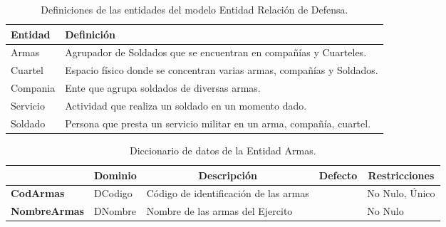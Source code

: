 \begin{table}[H]
\centering
\caption{Definiciones de las entidades del modelo Entidad Relación de Defensa.}
\renewcommand{\arraystretch}{1.5}%
\label{tab-Dicc-00}
\begin{tabular}{@{}ll@{}}
\toprule
\textbf{Entidad}  & \textbf{Definición}\\ \midrule
Armas    & Agrupador de Soldados que se encuentran en compañías y Cuarteles. \\
Cuartel  & Espacio físico donde se concentran varias armas, compañías y Soldados.\\
Compania & Ente que agrupa soldados de diversas armas.\\
Servicio & Actividad que realiza un soldado en un momento dado.\\
Soldado  & Persona que presta un servicio militar en un arma, compañía, cuartel.\\ \bottomrule
\end{tabular}
\end{table}

\begin{table}[H]
\centering
\caption{Diccionario de datos de la Entidad Armas.}
\label{tab-Dicc-01}
\begin{tabular}{>{\bfseries}m{4.0cm}>{}m{3.0cm}>{}m{6.0cm}>{}m{5.0cm}>{}m{2.0cm}}
\toprule
\multicolumn{1}{c}{\textbf{Atributo}} & \multicolumn{1}{c}{\textbf{Dominio}} & \multicolumn{1}{c}{\textbf{Descripción}} & \multicolumn{1}{c}{\textbf{Defecto}} & \multicolumn{1}{c}{\textbf{Restricciones}} \\ \midrule
CodArmas    & DCodigo   & Código de identificación de las armas &   & No Nulo, Único\\
NombreArmas & DNombre   & Nombre de las armas del Ejercito  &   & No Nulo\\ \bottomrule
\end{tabular}
\end{table}

